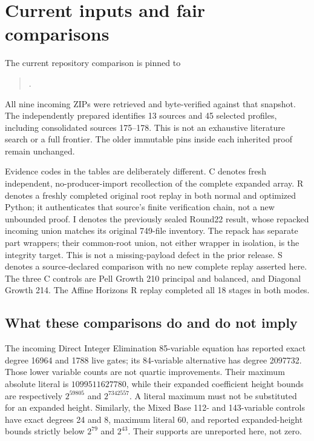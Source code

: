 \section{Current inputs and fair comparisons}
\label{sec:comparison}
The current repository comparison is pinned to
\begin{quote}\small
{}.
\end{quote}
All nine incoming ZIPs were retrieved and byte-verified against that snapshot.
The independently prepared  identifies
13 sources and 45 selected profiles, including consolidated sources 175--178.
This is not an exhaustive literature search or a full frontier. The older
immutable pins inside each inherited proof remain unchanged.

Evidence codes in the tables are deliberately different. C denotes fresh
independent, no-producer-import recollection of the complete expanded array.
R denotes a freshly completed original root replay in both normal and
optimized Python; it authenticates that source's finite verification chain,
not a new unbounded proof. I denotes the previously sealed Round22 result,
whose repacked incoming union matches its original 749-file inventory.
The repack has separate part wrappers; their common-root union, not either
wrapper in isolation, is the integrity target. This is not a missing-payload
defect in the prior release. S denotes a
source-declared comparison with no new complete replay asserted here.
The three C controls are Pell Growth 210 principal and balanced, and Diagonal
Growth 214. The Affine Horizons R replay completed all 18 stages in both modes.



\subsection{What these comparisons do and do not imply}
The incoming Direct Integer Elimination 85-variable equation has reported
exact degree 16964 and 1788 live gates; its 84-variable alternative has degree
2097732. Those lower variable counts are not quartic improvements. Their
maximum absolute literal is $1099511627780$, while their expanded coefficient
height bounds are respectively $2^{59805}$ and $2^{7342557}$. A literal maximum
must not be substituted for an expanded height. Similarly, the Mixed Base
112- and 143-variable controls have exact degrees 24 and 8, maximum literal
60, and reported expanded-height bounds strictly below $2^{79}$ and $2^{43}$.
Their supports are unreported here, not zero.

